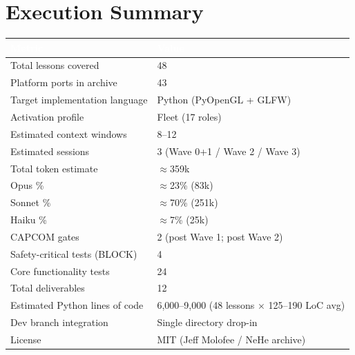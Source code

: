 \documentclass[11pt,letterpaper]{article}
\newcommand{\tableheader}[1]{\textbf{\sffamily\textcolor{white}{#1}}}
\begin{document}
\section{Execution Summary}

\begin{center}
\begin{tabularx}{\textwidth}{L{5cm}X}
\toprule
{}
\tableheader{Metric} & \tableheader{Value} \\
\midrule
Total lessons covered & 48 \\
Platform ports in archive & 43 \\
Target implementation language & Python (PyOpenGL + GLFW) \\
Activation profile & Fleet (17 roles) \\
Estimated context windows & 8--12 \\
Estimated sessions & 3 (Wave 0+1 / Wave 2 / Wave 3) \\
Total token estimate & $\approx$359k \\
Opus \% & $\approx$23\% (83k) \\
Sonnet \% & $\approx$70\% (251k) \\
Haiku \% & $\approx$7\% (25k) \\
CAPCOM gates & 2 (post Wave 1; post Wave 2) \\
Safety-critical tests (BLOCK) & 4 \\
Core functionality tests & 24 \\
Total deliverables & 12 \\
Estimated Python lines of code & 6,000--9,000 (48 lessons × 125--190 LoC avg) \\
Dev branch integration & Single directory drop-in \\
License & MIT (Jeff Molofee / NeHe archive) \\
\bottomrule
\end{tabularx}
\end{center}

\vspace{2em}
\end{document}
